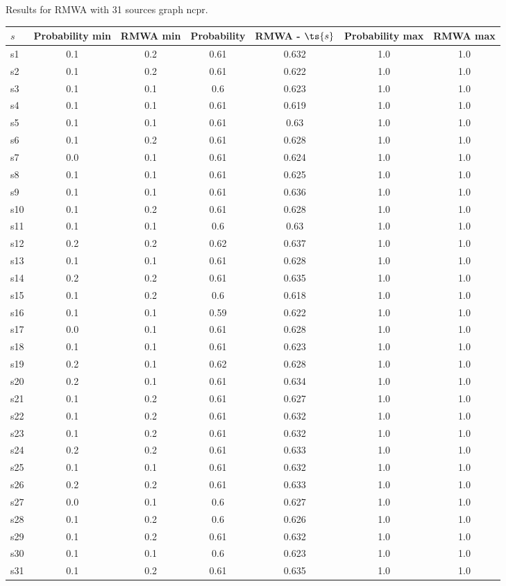 \documentclass{article}
\begin{document}
\noindent Results for RMWA with 31 sources graph ncpr.

\noindent\begin{tabular}{|l|c|c|c|c|c|c|}
\hline
$s$& Probability min & RMWA min & Probability & RMWA - $\ts{s}$ & Probability max & RMWA max\\
\hline
s1 &0.1 & 0.2 & 0.61 & 0.632 & 1.0 & 1.0\\
\hline
s2 &0.1 & 0.2 & 0.61 & 0.622 & 1.0 & 1.0\\
\hline
s3 &0.1 & 0.1 & 0.6 & 0.623 & 1.0 & 1.0\\
\hline
s4 &0.1 & 0.1 & 0.61 & 0.619 & 1.0 & 1.0\\
\hline
s5 &0.1 & 0.1 & 0.61 & 0.63 & 1.0 & 1.0\\
\hline
s6 &0.1 & 0.2 & 0.61 & 0.628 & 1.0 & 1.0\\
\hline
s7 &0.0 & 0.1 & 0.61 & 0.624 & 1.0 & 1.0\\
\hline
s8 &0.1 & 0.1 & 0.61 & 0.625 & 1.0 & 1.0\\
\hline
s9 &0.1 & 0.1 & 0.61 & 0.636 & 1.0 & 1.0\\
\hline
s10 &0.1 & 0.2 & 0.61 & 0.628 & 1.0 & 1.0\\
\hline
s11 &0.1 & 0.1 & 0.6 & 0.63 & 1.0 & 1.0\\
\hline
s12 &0.2 & 0.2 & 0.62 & 0.637 & 1.0 & 1.0\\
\hline
s13 &0.1 & 0.1 & 0.61 & 0.628 & 1.0 & 1.0\\
\hline
s14 &0.2 & 0.2 & 0.61 & 0.635 & 1.0 & 1.0\\
\hline
s15 &0.1 & 0.2 & 0.6 & 0.618 & 1.0 & 1.0\\
\hline
s16 &0.1 & 0.1 & 0.59 & 0.622 & 1.0 & 1.0\\
\hline
s17 &0.0 & 0.1 & 0.61 & 0.628 & 1.0 & 1.0\\
\hline
s18 &0.1 & 0.1 & 0.61 & 0.623 & 1.0 & 1.0\\
\hline
s19 &0.2 & 0.1 & 0.62 & 0.628 & 1.0 & 1.0\\
\hline
s20 &0.2 & 0.1 & 0.61 & 0.634 & 1.0 & 1.0\\
\hline
s21 &0.1 & 0.2 & 0.61 & 0.627 & 1.0 & 1.0\\
\hline
s22 &0.1 & 0.2 & 0.61 & 0.632 & 1.0 & 1.0\\
\hline
s23 &0.1 & 0.2 & 0.61 & 0.632 & 1.0 & 1.0\\
\hline
s24 &0.2 & 0.2 & 0.61 & 0.633 & 1.0 & 1.0\\
\hline
s25 &0.1 & 0.1 & 0.61 & 0.632 & 1.0 & 1.0\\
\hline
s26 &0.2 & 0.2 & 0.61 & 0.633 & 1.0 & 1.0\\
\hline
s27 &0.0 & 0.1 & 0.6 & 0.627 & 1.0 & 1.0\\
\hline
s28 &0.1 & 0.2 & 0.6 & 0.626 & 1.0 & 1.0\\
\hline
s29 &0.1 & 0.2 & 0.61 & 0.632 & 1.0 & 1.0\\
\hline
s30 &0.1 & 0.1 & 0.6 & 0.623 & 1.0 & 1.0\\
\hline
s31 &0.1 & 0.2 & 0.61 & 0.635 & 1.0 & 1.0\\
\hline
\end{tabular}\\
\end{document}
